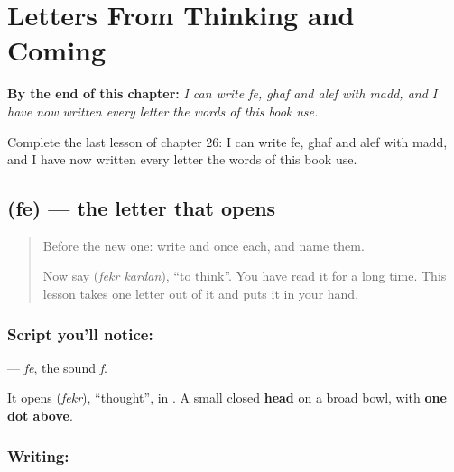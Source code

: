 
\chapter{Letters From Thinking and Coming}
\label{ch:fa-letters-thinking-coming}

\begin{chapteropening}
\textbf{By the end of this chapter:} \emph{I can write fe, ghaf and alef with madd, and I have now written every letter the words of this book use.}

Complete the last lesson of chapter 26: I can write fe, ghaf and alef with madd, and I have now written every letter the words of this book use.
\end{chapteropening}

\section[\texorpdfstring{\fa{ف} (fe)}{ف (fe)}]{ (fe) — the letter that opens }

\label{lesson:FA-W26-fe}



\begin{quote}
Before the new one: write  and  once each, and name them.

Now say \textbf{ } (\emph{fekr kardan}), \textquotedblleft{}to think\textquotedblright{}. You have read it for a long time. This lesson takes one letter out of it and puts it in your hand.
\end{quote}

\subsection*{Script you'll notice: }
\textbf{} — \emph{fe}, the sound \emph{f}.

It opens \textbf{} (\emph{fekr}), \textquotedblleft{}thought\textquotedblright{}, in \textbf{ }. A small closed \textbf{head} on a broad bowl, with \textbf{one dot above}.

\subsection*{Writing: }

